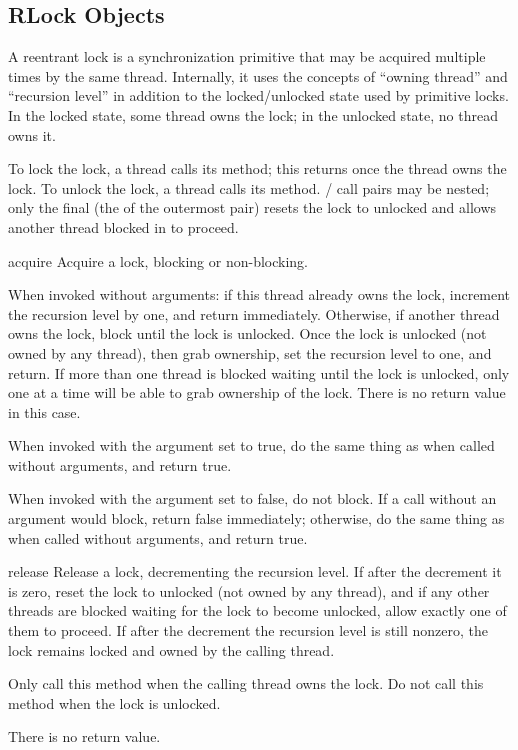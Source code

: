 \subsection{RLock Objects \label{rlock-objects}}

A reentrant lock is a synchronization primitive that may be
acquired multiple times by the same thread.  Internally, it uses
the concepts of ``owning thread'' and ``recursion level'' in
addition to the locked/unlocked state used by primitive locks.  In
the locked state, some thread owns the lock; in the unlocked
state, no thread owns it.

To lock the lock, a thread calls its  method; this
returns once the thread owns the lock.  To unlock the lock, a
thread calls its  method.
/ call pairs may be nested; only
the final  (the  of the outermost
pair) resets the lock to unlocked and allows another thread blocked in
 to proceed.

\begin{methoddesc}{acquire}{}
Acquire a lock, blocking or non-blocking.

When invoked without arguments: if this thread already owns
the lock, increment the recursion level by one, and return
immediately.  Otherwise, if another thread owns the lock,
block until the lock is unlocked.  Once the lock is unlocked
(not owned by any thread), then grab ownership, set the
recursion level to one, and return.  If more than one thread
is blocked waiting until the lock is unlocked, only one at a
time will be able to grab ownership of the lock.  There is no
return value in this case.

When invoked with the  argument set to true, do the
same thing as when called without arguments, and return true.

When invoked with the  argument set to false, do not
block.  If a call without an argument would block, return false
immediately; otherwise, do the same thing as when called
without arguments, and return true.
\end{methoddesc}

\begin{methoddesc}{release}{}
Release a lock, decrementing the recursion level.  If after the
decrement it is zero, reset the lock to unlocked (not owned by any
thread), and if any other threads are blocked waiting for the lock to
become unlocked, allow exactly one of them to proceed.  If after the
decrement the recursion level is still nonzero, the lock remains
locked and owned by the calling thread.

Only call this method when the calling thread owns the lock.
Do not call this method when the lock is unlocked.

There is no return value.
\end{methoddesc}


